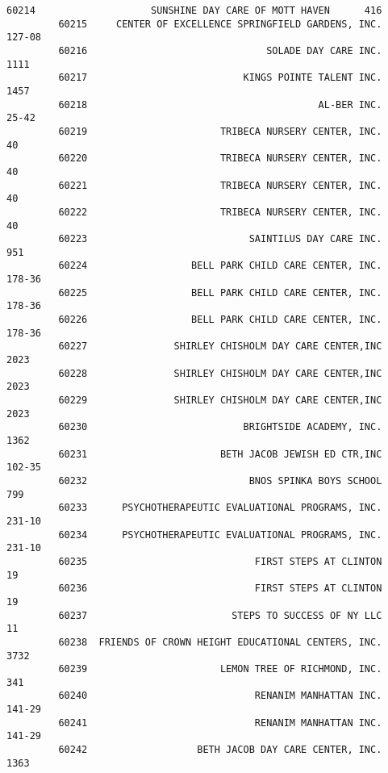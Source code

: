\documentclass[11pt]{article}
\begin{document}
\begin{Verbatim}[commandchars=\\\{\}]
         60214                    SUNSHINE DAY CARE OF MOTT HAVEN      416   
         60215     CENTER OF EXCELLENCE SPRINGFIELD GARDENS, INC.   127-08   
         60216                               SOLADE DAY CARE INC.     1111   
         60217                           KINGS POINTE TALENT INC.     1457   
         60218                                        AL-BER INC.    25-42   
         60219                       TRIBECA NURSERY CENTER, INC.       40   
         60220                       TRIBECA NURSERY CENTER, INC.       40   
         60221                       TRIBECA NURSERY CENTER, INC.       40   
         60222                       TRIBECA NURSERY CENTER, INC.       40   
         60223                            SAINTILUS DAY CARE INC.      951   
         60224                  BELL PARK CHILD CARE CENTER, INC.   178-36   
         60225                  BELL PARK CHILD CARE CENTER, INC.   178-36   
         60226                  BELL PARK CHILD CARE CENTER, INC.   178-36   
         60227               SHIRLEY CHISHOLM DAY CARE CENTER,INC     2023   
         60228               SHIRLEY CHISHOLM DAY CARE CENTER,INC     2023   
         60229               SHIRLEY CHISHOLM DAY CARE CENTER,INC     2023   
         60230                           BRIGHTSIDE ACADEMY, INC.     1362   
         60231                       BETH JACOB JEWISH ED CTR,INC   102-35   
         60232                            BNOS SPINKA BOYS SCHOOL      799   
         60233      PSYCHOTHERAPEUTIC EVALUATIONAL PROGRAMS, INC.   231-10   
         60234      PSYCHOTHERAPEUTIC EVALUATIONAL PROGRAMS, INC.   231-10   
         60235                             FIRST STEPS AT CLINTON       19   
         60236                             FIRST STEPS AT CLINTON       19   
         60237                         STEPS TO SUCCESS OF NY LLC       11   
         60238  FRIENDS OF CROWN HEIGHT EDUCATIONAL CENTERS, INC.     3732   
         60239                       LEMON TREE OF RICHMOND, INC.      341   
         60240                             RENANIM MANHATTAN INC.   141-29   
         60241                             RENANIM MANHATTAN INC.   141-29   
         60242                   BETH JACOB DAY CARE CENTER, INC.     1363   
         

\end{Verbatim}
\end{document}
